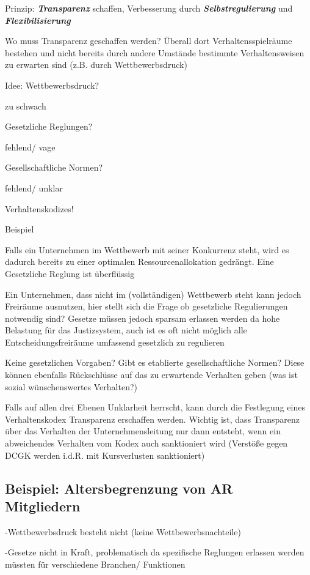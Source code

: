 \documentclass[
]{article}
\begin{document}
Prinzip: \textbf{\emph{Transparenz}} schaffen, Verbesserung durch
\textbf{\emph{Selbstregulierung}} und \textbf{\emph{Flexibilisierung}}

Wo muss Transparenz geschaffen werden? Überall dort Verhaltensspielräume
bestehen und nicht bereits durch andere Umstände bestimmte
Verhaltensweisen zu erwarten sind (z.B. durch Wettbewerbsdruck)

Idee: Wettbewerbsdruck?

zu schwach

Gesetzliche Reglungen?

fehlend/ vage

Gesellschaftliche Normen?

fehlend/ unklar

Verhaltenskodizes!

Beispiel

Falls ein Unternehmen im Wettbewerb mit seiner Konkurrenz steht, wird es
dadurch bereits zu einer optimalen Ressourcenallokation gedrängt. Eine
Gesetzliche Reglung ist überflüssig

Ein Unternehmen, dass nicht im (vollständigen) Wettbewerb steht kann
jedoch Freiräume ausnutzen, hier stellt sich die Frage ob gesetzliche
Regulierungen notwendig sind? Gesetze müssen jedoch sparsam erlassen
werden da hohe Belastung für das Justizsystem, auch ist es oft nicht
möglich alle Entscheidungsfreiräume umfassend gesetzlich zu regulieren

Keine gesetzlichen Vorgaben? Gibt es etablierte gesellschaftliche
Normen? Diese können ebenfalls Rückschlüsse auf das zu erwartende
Verhalten geben (was ist sozial wünschenswertes Verhalten?)

Falls auf allen drei Ebenen Unklarheit herrscht, kann durch die
Festlegung eines Verhaltenskodex Transparenz erschaffen werden. Wichtig
ist, dass Transparenz über das Verhalten der Unternehmensleitung nur
dann entsteht, wenn ein abweichendes Verhalten vom Kodex auch
sanktioniert wird (Verstöße gegen DCGK werden i.d.R. mit Kursverlusten
sanktioniert)

\hypertarget{beispiel-altersbegrenzung-von-ar-mitgliedern}{%
\subsection{Beispiel: Altersbegrenzung von AR
Mitgliedern}\label{beispiel-altersbegrenzung-von-ar-mitgliedern}}

-Wettbewerbsdruck besteht nicht (keine Wettbewerbsnachteile)

-Gesetze nicht in Kraft, problematisch da spezifische Reglungen erlassen
werden müssten für verschiedene Branchen/ Funktionen
\end{document}
